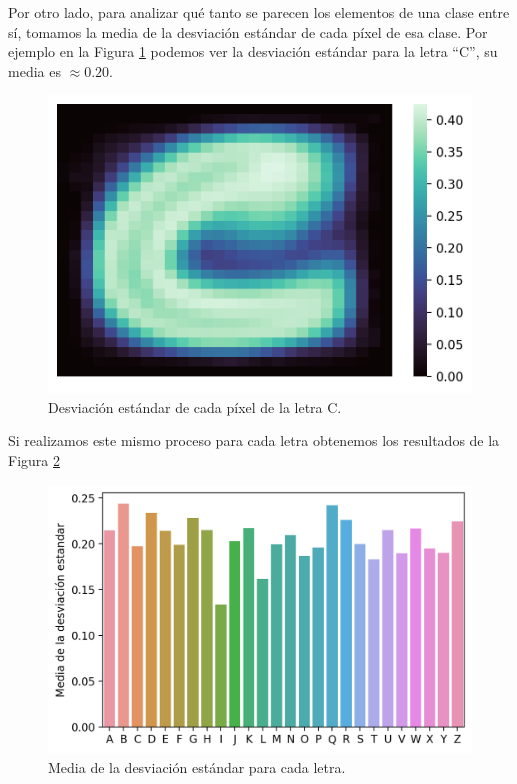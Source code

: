 \documentclass[11pt,a4paper, twocolumn]{article}
\begin{document}
Por otro lado, para analizar qué tanto se parecen los elementos de una clase entre sí, tomamos la media de la desviación estándar de cada píxel de esa clase. Por ejemplo en la Figura \ref{fig:5a} podemos ver la desviación estándar para la letra ``C'', su media es $\approx 0.20$.

\begin{figure}[H]
	\centering
	\includegraphics[scale=0.8]{figuras/5a.png}
	\caption{Desviación estándar de cada píxel de la letra C.}
	\label{fig:5a}
\end{figure}

Si realizamos este mismo proceso para cada letra obtenemos los resultados de la Figura \ref{fig:6a}

\begin{figure}[H]
	\centering
	\includegraphics[scale=0.8]{figuras/6a.png}
	\caption{Media de la desviación estándar para cada letra.}
	\label{fig:6a}
\end{figure}
\end{document}
